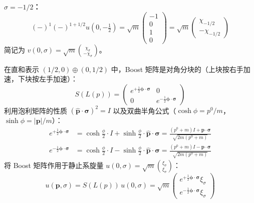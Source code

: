 \textbf{$\sigma = -1/2$：} 
\begin{equation}
        (-)^{1}(-)^{1+1/2}u(0, -\tfrac{1}{2})= \sqrt{m}\begin{pmatrix} -1\\0\\1\\0 \end{pmatrix} = \sqrt{m}\begin{pmatrix} \chi_{-1/2} \\ -\chi_{-1/2} \end{pmatrix}
\end{equation}
简记为 $v(0,\sigma) = \sqrt{m}\binom{\chi_\sigma}{-\chi_\sigma}$。
\vspace{2ex}\par
在直和表示 $(1/2,0)\oplus(0,1/2)$ 中，Boost 矩阵是对角分块的（上块按右手加速，下块按左手加速）：
\begin{equation}
    S(L(p)) = \begin{pmatrix} e^{+\frac{1}{2}\boldsymbol{\phi}\cdot\boldsymbol{\sigma}} & 0 \\ 0 & e^{-\frac{1}{2}\boldsymbol{\phi}\cdot\boldsymbol{\sigma}} \end{pmatrix}
\end{equation}
利用泡利矩阵的性质 $(\hat{\boldsymbol{p}}\cdot\boldsymbol{\sigma})^2 = I$ 以及双曲半角公式（$\cosh\phi = p^0/m$，$\sinh\phi = |\boldsymbol{p}|/m$）：
\begin{align}
    e^{+\frac{1}{2}\boldsymbol{\phi}\cdot\boldsymbol{\sigma}} &= \cosh\frac{\phi}{2}\cdot I + \sinh\frac{\phi}{2}\cdot\hat{\boldsymbol{p}}\cdot\boldsymbol{\sigma} = \frac{(p^0+m)I + \boldsymbol{p}\cdot\boldsymbol{\sigma}}{\sqrt{2m(p^0+m)}} \\
    e^{-\frac{1}{2}\boldsymbol{\phi}\cdot\boldsymbol{\sigma}} &= \cosh\frac{\phi}{2}\cdot I - \sinh\frac{\phi}{2}\cdot\hat{\boldsymbol{p}}\cdot\boldsymbol{\sigma} = \frac{(p^0+m)I - \boldsymbol{p}\cdot\boldsymbol{\sigma}}{\sqrt{2m(p^0+m)}}
\end{align}
将 Boost 矩阵作用于静止系旋量 $u(0,\sigma) = \sqrt{m}\binom{\xi_\sigma}{\xi_\sigma}$：
\begin{equation}
    u(\boldsymbol{p},\sigma) = S(L(p))\, u(0,\sigma) = \sqrt{m}\begin{pmatrix} e^{+\frac{1}{2}\boldsymbol{\phi}\cdot\boldsymbol{\sigma}}\xi_\sigma \\ e^{-\frac{1}{2}\boldsymbol{\phi}\cdot\boldsymbol{\sigma}}\xi_\sigma \end{pmatrix}
\end{equation}
